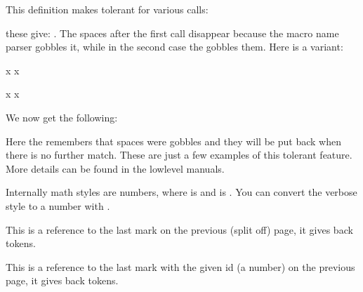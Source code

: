 \startbuffer
\tolerant{}
\stopbuffer

\typebuffer \getbuffer

This definition makes \type {\foo} tolerant for various calls:

\startbuffer
\foo \foo[1] \foo [1] \foo[1] [2] \foo [1] [2]
\stopbuffer

\typebuffer

these give: \inlinebuffer. The spaces after the first call disappear because the
macro name parser gobbles it, while in the second case the \type {#*} gobbles
them. Here is a variant:

\startbuffer
\tolerant{}

\foo[?] x
\foo[?] [?] x

\tolerant{}

\foo[?] x
\foo[?] [?] x
\stopbuffer

\typebuffer

We now get the following:

\getbuffer

Here the \type {#,} remembers that spaces were gobbles and they will be put back
when there is no further match. These are just a few examples of this tolerant
feature. More details can be found in the lowlevel manuals.

\stopnewprimitive


\startnewprimitive[title={\prm {tomathstyle}}]

Internally math styles are numbers, where  is \tomathstyle
\displaystyle \space and  is \tomathstyle
\crampedscriptscriptstyle. You can convert the verbose style to a number with
.

\stopnewprimitive

\startoldprimitive[title={\prm {topmark}}][obsolete=yes]

This is a reference to the last mark on the previous (split off) page, it gives
back tokens.

\stopoldprimitive

\startoldprimitive[title={\prm {topmarks}}]

This is a reference to the last mark with the given id (a number) on the previous
page, it gives back tokens.

\stopoldprimitive

